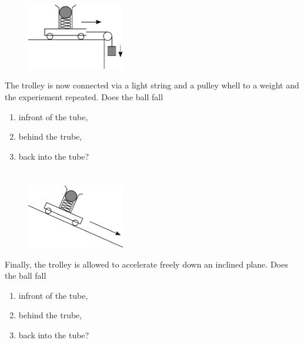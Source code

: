 \section{}
\begin{figure}
  \vspace{-20pt}
  \begin{center}
  	\includegraphics[width=0.38\textwidth]{trolley2.pdf}
  \end{center}
  \vspace{-20pt}
\end{figure}
The trolley is now connected via a light string and a pulley whell to a weight and the experiement repeated. Does the ball fall
\begin{enumerate}[label=\alph*)]
	\item infront of the tube,
	\item behind the trube,
	\item back into the tube?
\end{enumerate}

\section{}
\begin{figure}
  \vspace{-20pt}
  \begin{center}
  	\includegraphics[width=0.38\textwidth]{trolley3.pdf}
  \end{center}
  \vspace{-20pt}
\end{figure}
Finally, the trolley is allowed to accelerate freely down an inclined plane. Does the ball fall
\begin{enumerate}[label=\alph*)]
	\item infront of the tube,
	\item behind the trube,
	\item back into the tube?
\end{enumerate}
